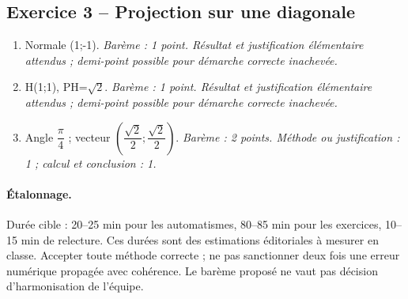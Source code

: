 \subsection*{Exercice 3 -- Projection sur une diagonale}
\begin{enumerate}
\item Normale (1;-1). \textit{Barème : 1 point. Résultat et justification élémentaire attendus ; demi-point possible pour démarche correcte inachevée.}
\item H(1;1), PH=$\sqrt2$. \textit{Barème : 1 point. Résultat et justification élémentaire attendus ; demi-point possible pour démarche correcte inachevée.}
\item Angle $\dfrac{\pi}{4}$ ; vecteur $(\dfrac{\sqrt 2}{2};\dfrac{\sqrt 2}{2})$. \textit{Barème : 2 points. Méthode ou justification : 1 ; calcul et conclusion : 1.}
\end{enumerate}
\paragraph{Étalonnage.} Durée cible : 20–25 min pour les automatismes, 80–85 min pour les exercices, 10–15 min de relecture. Ces durées sont des estimations éditoriales à mesurer en classe. Accepter toute méthode correcte ; ne pas sanctionner deux fois une erreur numérique propagée avec cohérence. Le barème proposé ne vaut pas décision d’harmonisation de l’équipe.
